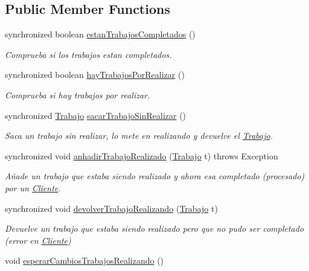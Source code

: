 \subsection*{Public Member Functions}
\begin{DoxyCompactItemize}
\item 
synchronized boolean \hyperlink{classServidor_a210f62b0f4ccd1d3eccc6eff7051d640}{estan\+Trabajos\+Completados} ()
\begin{DoxyCompactList}\small\item\em Comprueba si los trabajos estan completados. \end{DoxyCompactList}\item 
synchronized boolean \hyperlink{classServidor_ad2d3e79eeac3e52edcec0c4ef17ffce6}{hay\+Trabajos\+Por\+Realizar} ()
\begin{DoxyCompactList}\small\item\em Comprueba si hay trabajos por realizar. \end{DoxyCompactList}\item 
synchronized \hyperlink{classTrabajo}{Trabajo} \hyperlink{classServidor_a1afa144ebeacbf0e9960ab8b5a1d3419}{sacar\+Trabajo\+Sin\+Realizar} ()
\begin{DoxyCompactList}\small\item\em Saca un trabajo sin realizar, lo mete en realizando y devuelve el \hyperlink{classTrabajo}{Trabajo}. \end{DoxyCompactList}\item 
synchronized void \hyperlink{classServidor_a94e88d197276e470cb7373b8ca3ae847}{anhadir\+Trabajo\+Realizado} (\hyperlink{classTrabajo}{Trabajo} t)  throws Exception 
\begin{DoxyCompactList}\small\item\em Añade un trabajo que estaba siendo realizado y ahora esa completado (procesado) por un \hyperlink{classCliente}{Cliente}. \end{DoxyCompactList}\item 
synchronized void \hyperlink{classServidor_a15c19b2947826047e0664915f86a16d8}{devolver\+Trabajo\+Realizando} (\hyperlink{classTrabajo}{Trabajo} t)
\begin{DoxyCompactList}\small\item\em Devuelve un trabajo que estaba siendo realizado pero que no pudo ser completado (error en \hyperlink{classCliente}{Cliente}) \end{DoxyCompactList}\item 
void \hyperlink{classServidor_adc224162ae15224464bf33d0f6bf79e9}{esperar\+Cambios\+Trabajos\+Realizando} ()

\end{DoxyCompactItemize}
